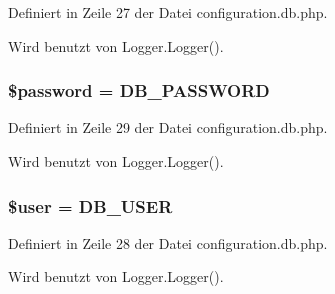 Definiert in Zeile 27 der Datei configuration.db.php.

Wird benutzt von Logger.Logger().
\subsubsection{\setlength{\rightskip}{0pt plus 5cm}\$password = {\bf DB\_\-PASSWORD}}\label{configuration_8db_8php_607686ef9f99ea7c42f4f3dd3dbb2b0d}




Definiert in Zeile 29 der Datei configuration.db.php.

Wird benutzt von Logger.Logger().
\subsubsection{\setlength{\rightskip}{0pt plus 5cm}\$user = {\bf DB\_\-USER}}\label{configuration_8db_8php_598ca4e71b15a1313ec95f0df1027ca5}




Definiert in Zeile 28 der Datei configuration.db.php.

Wird benutzt von Logger.Logger().